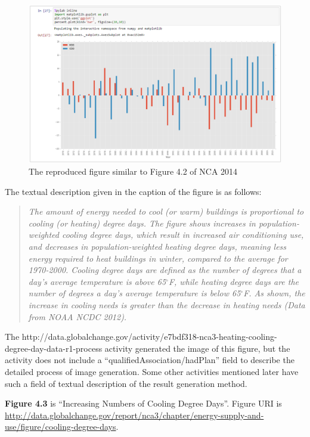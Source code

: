 \begin{figure}
	\includegraphics[width=\textwidth]{nca3image.png}
	\caption{The reproduced figure similar to Figure 4.2 of NCA 2014}
	\label{fig:nca3image}
\end{figure}

The textual description given in the caption of the figure is as follows:
\begin{quotation}\emph{
The amount of energy needed to cool (or warm) buildings is proportional to cooling (or heating) degree days. The figure shows increases in population-weighted cooling degree days, which result in increased air conditioning use, and decreases in population-weighted heating degree days, meaning less energy required to heat buildings in winter, compared to the average for 1970-2000. Cooling degree days are defined as the number of degrees that a day's average temperature is above 65$^{\circ}$F, while heating degree days are the number of degrees a day's average temperature is below 65$^{\circ}$F. As shown, the increase in cooling needs is greater than the decrease in heating needs (Data from NOAA NCDC 2012).}

\end{quotation}

The http://data.globalchange.gov/activity/e7bdf318-nca3-heating-cooling- degree-day-data-r1-process activity generated the image of this figure, but the activity does not include a ``qualifiedAssociation/hadPlan'' field to describe the detailed process of image generation. Some other activities mentioned later have such a field of textual description of the result generation method.

\textbf{Figure 4.3} is ``Increasing Numbers of Cooling Degree Days''. Figure URI is \url{http://data.globalchange.gov/report/nca3/chapter/energy-supply-and-use/figure/cooling-degree-days}.

